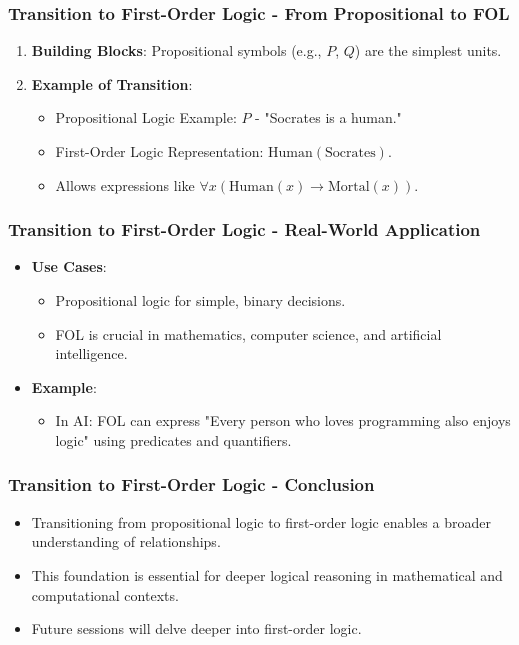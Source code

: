 \documentclass[aspectratio=169]{beamer}
\begin{document}
\begin{frame}[fragile]
    \frametitle{Transition to First-Order Logic - From Propositional to FOL}
    \begin{enumerate}
        \item \textbf{Building Blocks}: Propositional symbols (e.g., $ P $, $ Q $) are the simplest units.
        
        \item \textbf{Example of Transition}:
        \begin{itemize}
            \item Propositional Logic Example: $ P $ - "Socrates is a human."
            \item First-Order Logic Representation: \( \text{Human}(\text{Socrates}) \).
            \item Allows expressions like \( \forall x (\text{Human}(x) \rightarrow \text{Mortal}(x)) \).
        \end{itemize}
    \end{enumerate}
\end{frame}

\begin{frame}[fragile]
    \frametitle{Transition to First-Order Logic - Real-World Application}
    \begin{itemize}
        \item \textbf{Use Cases}:
        \begin{itemize}
            \item Propositional logic for simple, binary decisions.
            \item FOL is crucial in mathematics, computer science, and artificial intelligence.
        \end{itemize}
        
        \item \textbf{Example}:
        \begin{itemize}
            \item In AI: FOL can express "Every person who loves programming also enjoys logic" using predicates and quantifiers.
        \end{itemize}
    \end{itemize}
\end{frame}

\begin{frame}[fragile]
    \frametitle{Transition to First-Order Logic - Conclusion}
    \begin{itemize}
        \item Transitioning from propositional logic to first-order logic enables a broader understanding of relationships.
        \item This foundation is essential for deeper logical reasoning in mathematical and computational contexts.
        \item Future sessions will delve deeper into first-order logic.
    \end{itemize}
\end{frame}
\end{document}
